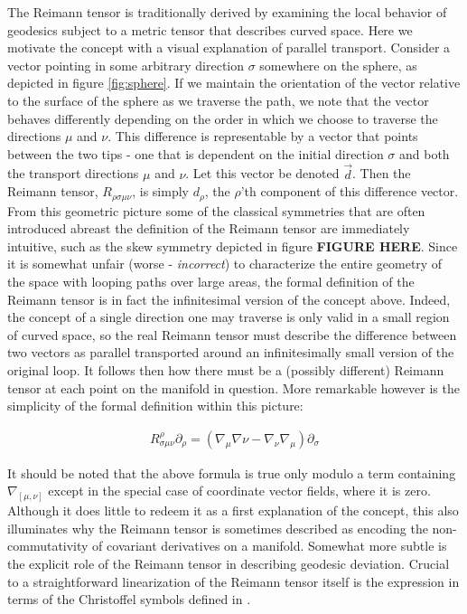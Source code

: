The Reimann tensor is traditionally derived by examining the local behavior of geodesics subject to a metric tensor that describes curved space. Here we motivate the concept with a visual explanation of parallel transport. Consider a vector pointing in some arbitrary direction $\sigma$ somewhere on the sphere, as depicted in figure \ref{fig:sphere}. If we maintain the orientation of the vector relative to the surface of the sphere as we traverse the path, we note that the vector behaves differently depending on the order in which we choose to traverse the directions $\mu$ and $\nu$. This difference is representable by a vector that points between the two tips - one that is dependent on the initial direction $\sigma$ and both the transport directions $\mu$ and $\nu$. Let this vector be denoted $\vec{d}$. Then the Reimann tensor, $R_{\rho \sigma \mu \nu}$, is simply $d_{\rho}$, the $\rho$'th component of this difference vector. From this geometric picture some of the classical symmetries that are often introduced abreast the definition of the Reimann tensor are immediately intuitive, such as the skew symmetry depicted in figure \textbf{FIGURE HERE}.
Since it is somewhat unfair (worse - \textit{incorrect}) to characterize the entire geometry of the space with looping paths over large areas, the formal definition of the Reimann tensor is in fact the infinitesimal version of the concept above. Indeed, the concept of a single direction one may traverse is only valid in a small region of curved space, so the real Reimann tensor must describe the difference between two vectors as parallel transported around an infinitesimally small version of the original loop. It follows then how there must be a (possibly different) Reimann tensor at each point on the manifold in question. More remarkable however is the simplicity of the formal definition within this picture:

\begin{align}
R^{\rho}_{\sigma \mu \nu}\partial_{\rho} = \left(\nabla_{\mu}\nabla{\nu} - \nabla_{\nu}\nabla_{\mu}\right)\partial_{\sigma}
\end{align} 

It should be noted that the above formula is true only modulo a term containing $\nabla_{[\mu, \nu]}$ except in the special case of coordinate vector fields, where it is zero. Although it does little to redeem it as a first explanation of the concept, this also illuminates why the Reimann tensor is sometimes described as encoding the non-commutativity of covariant derivatives on a manifold. Somewhat more subtle is the explicit role of the Reimann tensor in describing geodesic deviation. Crucial to a straightforward linearization of the Reimann tensor itself is the expression in terms of the Christoffel symbols defined in . 

